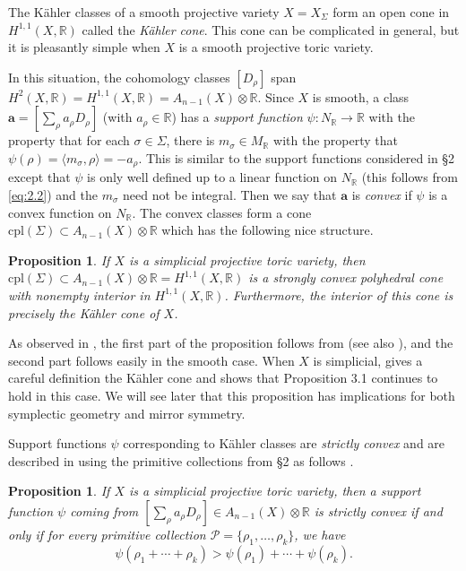 \documentclass{amsart}
\theoremstyle{plain}
\newtheorem{proposition}[theorem]{Proposition}
\theoremstyle{definition}
\begin{document}
	The K\"ahler classes of a smooth projective variety $X =
X_\Sigma$ form an open cone in $H^{1,1}(X,\mathbb{R})$ called the {\it
K\"ahler cone\/}.  This cone can be complicated in general, but it is
pleasantly simple when $X$ is a smooth projective toric variety.

	In this situation, the cohomology classes $[D_\rho]$ span
$H^2(X,\mathbb{R}) = H^{1,1}(X,\mathbb{R}) = A_{n-1}(X)\otimes\mathbb{R}$.
Since $X$ is smooth, a class $\mathbf{a} = [\sum_\rho a_\rho D_\rho]$
(with $a_\rho \in \mathbb{R}$) has a {\it support function\/} $\psi :
N_{\mathbb{R}} \to \mathbb{R}$ with the property that for each $\sigma \in
\Sigma$, there is $m_\sigma \in M_{\mathbb{R}}$ with the property that
$\psi(\rho) = \langle m_\sigma,\rho\rangle = -a_\rho$.  This is
similar to the support functions considered in \S2 except that $\psi$
is only well defined up to a linear function on $N_{\mathbb{R}}$ (this
follows from \eqref{eq:2.2}) and the $m_\sigma$ need not be integral.
Then we say that $\mathbf{a}$ is {\it convex\/} if $\psi$ is a convex
function on $N_{\mathbb{R}}$.  The convex classes form a cone
$\mathrm{cpl}(\Sigma) \subset A_{n-1}(X)\otimes\mathbb{R}$ which has the
following nice structure.

\begin{proposition} If $X$ is a simplicial projective toric
variety, then $\mathrm{cpl}(\Sigma) \subset A_{n-1}(X)\otimes\mathbb{R} =
H^{1,1}(X,\mathbb{R})$ is a strongly convex polyhedral cone with
nonempty interior in $H^{1,1}(X,\mathbb{R})$.  Furthermore, the interior
of this cone is precisely the K\"ahler cone of $X$.
\end{proposition}

	As observed in \cite{Bat3}, the first part of the proposition
follows from \cite{OP} (see also \cite{Rei2}), and the second part
follows easily in the smooth case.  When $X$ is simplicial,
\cite{AGM2} gives a careful definition the K\"ahler cone and shows
that Proposition 3.1 continues to hold in this case.  We will see
later that this proposition has implications for both symplectic
geometry and mirror symmetry.

	Support functions $\psi$ corresponding to K\"ahler classes are
{\it strictly convex\/} and are described in \cite{Bat3} using the
primitive collections from \S2 as follows .

\begin{proposition} If $X$ is a simplicial projective toric
variety, then a support function $\psi$ coming from $[\sum_\rho a_\rho
D_\rho] \in A_{n-1}(X)\otimes\mathbb{R}$ is strictly convex if and only
if for every primitive collection $\mathcal{P} = \{\rho_1,\dots,\rho_k\}$,
we have
\[
\psi(\rho_1 + \cdots + \rho_k) > \psi(\rho_1) + \cdots + \psi(\rho_k).
\]
\end{proposition}
\end{document}
